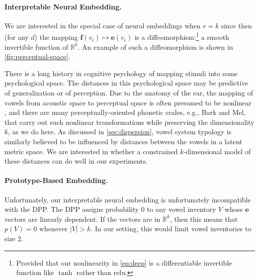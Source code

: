 \documentclass[11pt,a4paper]{article}
\renewcommand{\cite}[2][]{\citep[#1]{#2}}
\newcommand{\Real}{\mathbb{R}}
\newcommand{\e}{{\boldsymbol e}}
\newcommand{\f}{{\boldsymbol f}}
\begin{document}
\paragraph{Interpretable Neural Embedding.}

We are interested in the special case of neural embeddings when $r=k$
since then (for any $d$) the mapping $\f(v_i) \mapsto \e(v_i)$ is a 
diffeomorphism:\footnote{Provided that our nonlinearity in \eqref{eq:deep}
is a differentiable invertible function like $\tanh$ rather than $\mathrm{relu}$.}
a smooth invertible function of $\Real^k$.  An example
of such a diffeomorphism is shown in \cref{fig:perceptual-space}.

There is a long history in cognitive psychology of mapping stimuli
into some psychological space.  The distances in this psychological
space may be predictive of generalization \cite{shepard-1987} or of
perception.  Due to the anatomy of the ear, the mapping of vowels from
acoustic space to perceptual space is often presumed to be nonlinear
\cite{rosner1994vowel,nearey2003comparison}, and there are many
perceptually-oriented phonetic scales, e.g., Bark and Mel, that carry
out such nonlinear transformations while preserving the dimensionality
$k$, as we do here.
As discussed in \cref{sec:dispersion}, vowel system typology is similarly
believed to be influenced by distances between the vowels in a latent
metric space.  We are interested in whether a constrained $k$-dimensional model of
these distances can do well in our experiments.

\paragraph{Prototype-Based Embedding.}
Unfortunately, our interpretable neural embedding is unfortunately incompatible with
the DPP.  The DPP assigns probability 0 to any vowel inventory $V$
whose $\e$ vectors are linearly dependent.  If the vectors are in
$\Real^k$, then this means that $p(V) = 0$ whenever $|V| > k$.  In our
setting, this would limit vowel inventories to size 2.
\end{document}

